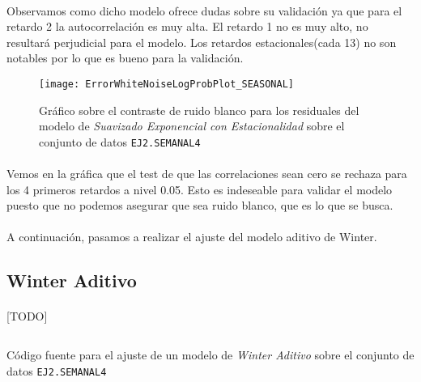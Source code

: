 \documentclass[a4paper, spanish]{article}
\begin{document}
      \paragraph{}
      Observamos como dicho modelo ofrece dudas sobre su validación ya que para el retardo 2 la autocorrelación es muy alta. El retardo 1 no es muy alto, no resultará perjudicial para el modelo. Los retardos estacionales(cada 13) no son notables por lo que es bueno para la validación.

      \begin{figure}[htb!]
        \centering
        \texttt{[image: ErrorWhiteNoiseLogProbPlot\_SEASONAL]}
        \caption{Gráfico sobre el contraste de ruido blanco para los residuales del modelo de \emph{Suavizado Exponencial con Estacionalidad} sobre el conjunto de datos \texttt{EJ2.SEMANAL4}}
        \label{img:b_seasonal_test_white_noise}
      \end{figure}

      \paragraph{}
      Vemos en la gráfica que el test de que las correlaciones sean cero se rechaza para los 4 primeros retardos a nivel 0.05. Esto es indeseable para validar el modelo puesto que no podemos asegurar que sea ruido blanco, que es lo que se busca.

      \paragraph{}
      A continuación, pasamos a realizar el ajuste del modelo aditivo de Winter.

    \subsection{Winter Aditivo}

      \paragraph{}
      [TODO]

      \begin{listing}[htb!]
        \centering
        \inputminted{SAS}{./res/code/b-01-esm-winteradd.sas}
        \caption{Código fuente para el ajuste de un modelo de \emph{Winter Aditivo} sobre el conjunto de datos \texttt{EJ2.SEMANAL4}}
        \label{code:b_winter_additive_esm}
      \end{listing}
\end{document}
